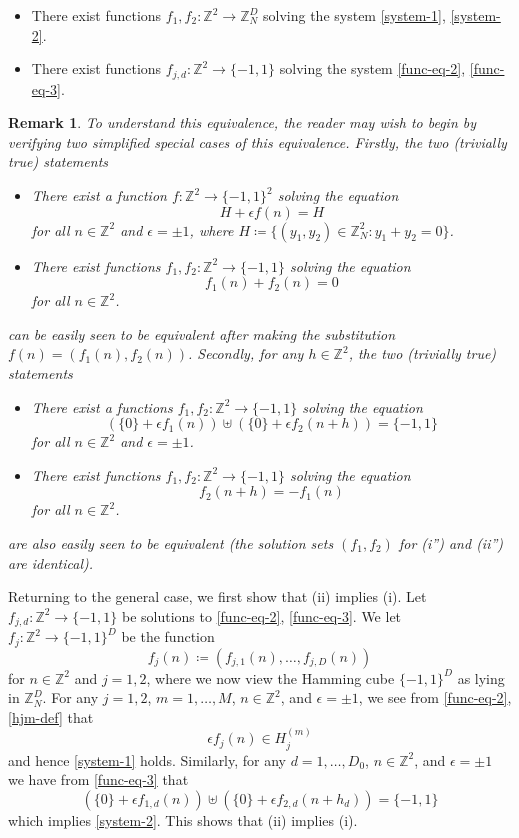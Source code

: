 \documentclass[reqno,a4paper,12pt]{amsart}
\numberwithin{equation}{section}
\numberwithin{figure}{section}
\def\Z{\mathbb{Z}}
\theoremstyle{plain}
\newtheorem{remark}[thm]{Remark}
\theoremstyle{definition}
\begin{document}
\begin{itemize}
\item[(i)]  There exist functions $f_1, f_2 \colon \Z^2 \to \Z_N^D$ solving the system \eqref{system-1}, \eqref{system-2}.
\item[(ii)]  There exist functions $f_{j,d} \colon \Z^2 \to \{-1,1\}$ solving the system \eqref{func-eq-2}, \eqref{func-eq-3}.
\end{itemize}

\begin{remark} To understand this equivalence, the reader may wish to begin by verifying two simplified special cases of this equivalence.  Firstly, the two (trivially true) statements
\begin{itemize}
    \item[(i')]  There exist a function $f \colon \Z^2 \to \{-1,1\}^2$ solving the equation $$H + \epsilon f(n) = H$$ for all $n \in \Z^2$ and $\epsilon = \pm 1$, where $H \coloneqq \{ (y_1,y_2) \in \Z_N^2: y_1+y_2=0\}$.
    \item[(ii')]  There exist functions $f_1,f_2 \colon \Z^2 \to \{-1,1\}$ solving the equation $$f_1(n)+f_2(n) = 0$$ for all $n \in \Z^2$.
\end{itemize}
can be easily seen to be equivalent after making the substitution $f(n) = (f_1(n), f_2(n))$.  Secondly, for any $h \in \Z^2$, the two (trivially true) statements
\begin{itemize}
    \item[(i'')]  There exist a functions $f_1,f_2 \colon \Z^2 \to \{-1,1\}$ solving the equation $$(\{0\} + \epsilon f_1(n)) \uplus (\{0\} + \epsilon f_2(n+h)) = \{-1,1\}$$ for all $n \in \Z^2$ and $\epsilon = \pm 1$.
    \item[(ii'')]  There exist functions $f_1,f_2 \colon \Z^2 \to \{-1,1\}$ solving the equation $$f_2(n+h) = -f_1(n)$$ for all $n \in \Z^2$.
\end{itemize}
are also easily seen to be equivalent (the solution sets $(f_1,f_2)$ for (i'') and (ii'') are identical). 
\end{remark}

Returning to the general case, we first show that (ii) implies (i).  Let  $f_{j,d} \colon \Z^2 \to \{-1,1\}$ be solutions to \eqref{func-eq-2}, \eqref{func-eq-3}.  We let $f_j \colon \Z^2 \to \{-1,1\}^D$ be the function
\begin{equation}\label{fjn}
 f_j(n) \coloneqq (f_{j,1}(n), \dots, f_{j,D}(n))
 \end{equation}
for $n \in \Z^2$ and $j=1,2$, where we now view the Hamming cube $\{-1,1\}^D$ as lying in $\Z_N^D$.  For any $j=1,2$, $m=1,\dots,M$, $n \in \Z^2$, and $\epsilon= \pm 1$, we see from \eqref{func-eq-2}, \eqref{hjm-def} that
$$ \epsilon f_j(n) \in H_j^{(m)}$$
and hence \eqref{system-1} holds.  Similarly, for any $d=1,\dots,D_0$, $n \in \Z^2$, and $\epsilon = \pm 1$ we have from \eqref{func-eq-3} that
$$ (\{0\} + \epsilon f_{1,d}(n)) \uplus (\{0\} + \epsilon f_{2,d}(n+h_d)) = \{-1,1\}$$
which implies \eqref{system-2}. This shows that (ii) implies (i).
\end{document}
